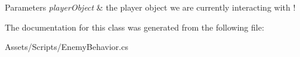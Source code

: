 \begin{DoxyParams}{Parameters}
{\em player\+Object} & the player object we are currently interacting with ! \\
\hline
\end{DoxyParams}


The documentation for this class was generated from the following file\+:\begin{DoxyCompactItemize}
\item 
Assets/\+Scripts/Enemy\+Behavior.\+cs\end{DoxyCompactItemize}
